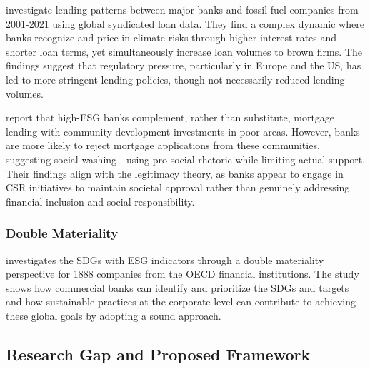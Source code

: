 \documentclass[
  authoryear]{elsarticle}
\begin{document}
\citet{DEMETRIADES2025} investigate lending patterns between major banks
and fossil fuel companies from 2001-2021 using global syndicated loan
data. They find a complex dynamic where banks recognize and price in
climate risks through higher interest rates and shorter loan terms, yet
simultaneously increase loan volumes to brown firms. The findings
suggest that regulatory pressure, particularly in Europe and the US, has
led to more stringent lending policies, though not necessarily reduced
lending volumes.

\citet{BASU2022} report that high-ESG banks complement, rather than
substitute, mortgage lending with community development investments in
poor areas. However, banks are more likely to reject mortgage
applications from these communities, suggesting social washing---using
pro-social rhetoric while limiting actual support. Their findings align
with the legitimacy theory, as banks appear to engage in CSR initiatives
to maintain societal approval rather than genuinely addressing financial
inclusion and social responsibility.

\subsubsection{Double Materiality}\label{double-materiality}

\citet{ARAS2024} investigates the SDGs with ESG indicators through a
double materiality perspective for 1888 companies from the OECD
financial institutions. The study shows how commercial banks can
identify and prioritize the SDGs and targets and how sustainable
practices at the corporate level can contribute to achieving these
global goals by adopting a sound approach.

\subsection{Research Gap and Proposed
Framework}\label{research-gap-and-proposed-framework}
\end{document}
